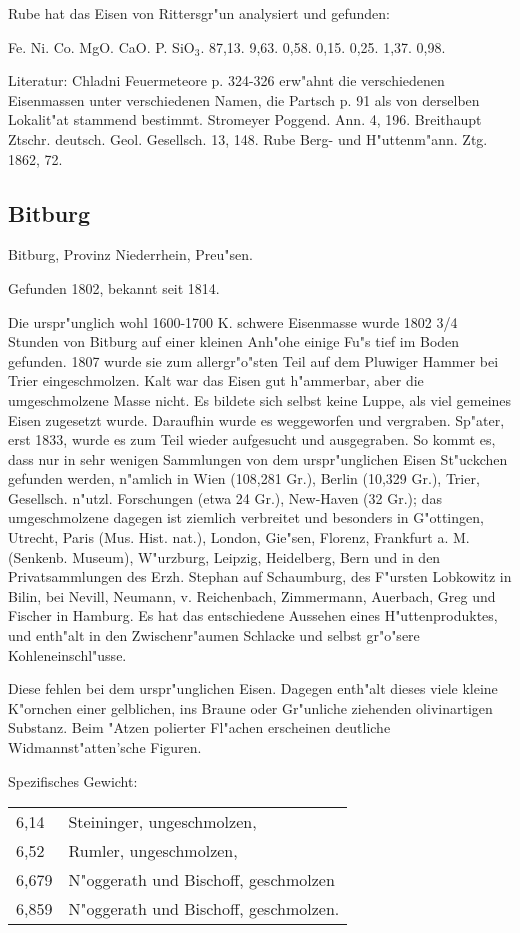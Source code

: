 \documentclass[a4paper, 11pt, oneside]{article}
\begin{document}
Rube hat das Eisen von Rittersgr"un analysiert und gefunden:

Fe. Ni. Co. MgO. CaO. P. SiO$_{3}$.  
87,13. 9,63. 0,58. 0,15. 0,25. 1,37. 0,98.

Literatur: Chladni Feuermeteore p. 324-326 erw"ahnt die verschiedenen Eisenmassen unter verschiedenen Namen, die Partsch p. 91 als von derselben Lokalit"at stammend bestimmt. Stromeyer Poggend. Ann. 4, 196. Breithaupt Ztschr. deutsch. Geol. Gesellsch. 13, 148. Rube Berg- und H"uttenm"ann. Ztg. 1862, 72.

\subsection{Bitburg}

Bitburg, Provinz Niederrhein, Preu"sen.

Gefunden 1802, bekannt seit 1814.

Die urspr"unglich wohl 1600-1700 K. schwere Eisenmasse wurde 1802 3/4 Stunden von Bitburg auf einer kleinen Anh"ohe einige Fu"s tief im Boden gefunden. 1807 wurde sie zum allergr"o"sten Teil auf dem Pluwiger Hammer bei Trier eingeschmolzen. Kalt war das Eisen gut h"ammerbar, aber die umgeschmolzene Masse nicht. Es bildete sich selbst keine Luppe, als viel gemeines Eisen zugesetzt wurde. Daraufhin wurde es weggeworfen und vergraben. Sp"ater, erst 1833, wurde es zum Teil wieder aufgesucht und ausgegraben. So kommt es, dass nur in sehr wenigen Sammlungen von dem urspr"unglichen Eisen St"uckchen gefunden werden, n"amlich in Wien (108,281 Gr.), Berlin (10,329 Gr.), Trier, Gesellsch. n"utzl. Forschungen (etwa 24 Gr.), New-Haven (32 Gr.); das umgeschmolzene dagegen ist ziemlich verbreitet und besonders in G"ottingen, Utrecht, Paris (Mus. Hist. nat.), London, Gie"sen, Florenz, Frankfurt a. M. (Senkenb. Museum), W"urzburg, Leipzig, Heidelberg, Bern und in den Privatsammlungen des Erzh. Stephan auf Schaumburg, des F"ursten Lobkowitz in Bilin, bei Nevill, Neumann, v. Reichenbach, Zimmermann, Auerbach, Greg und Fischer in Hamburg. Es hat das entschiedene Aussehen eines H"uttenproduktes, und enth"alt in den Zwischenr"aumen Schlacke und selbst gr"o"sere Kohleneinschl"usse.

Diese fehlen bei dem urspr"unglichen Eisen. Dagegen enth"alt dieses viele kleine K"ornchen einer gelblichen, ins Braune oder Gr"unliche ziehenden olivinartigen Substanz. Beim "Atzen polierter Fl"achen erscheinen deutliche Widmannst"atten'sche Figuren.

Spezifisches Gewicht:  
\begin{table}[!ht]
    \centering
    \begin{tabular}{l l}
        6,14 & Steininger, ungeschmolzen,\\
        6,52 & Rumler, ungeschmolzen,\\
        6,679 & N"oggerath und Bischoff, geschmolzen\\
        6,859 & N"oggerath und Bischoff, geschmolzen.
    \end{tabular}
\end{table}
\end{document}
